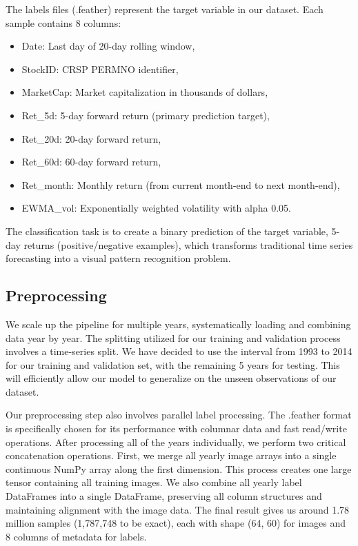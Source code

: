 \documentclass[12pt]{article}
\begin{document}
The labels files (.feather) represent the target variable in our dataset. Each sample contains 8 columns:

\begin{itemize}
	\item Date: Last day of 20-day rolling window,
	\item StockID: CRSP PERMNO identifier,
	\item MarketCap: Market capitalization in thousands of dollars,
	\item Ret\_5d: 5-day forward return (primary prediction target),
	\item Ret\_20d: 20-day forward return,
	\item Ret\_60d: 60-day forward return,
	\item Ret\_month: Monthly return (from current month-end to next month-end),
	\item EWMA\_vol: Exponentially weighted volatility with alpha 0.05.
\end{itemize}
The classification task is to create a binary prediction of the target variable, 5-day returns (positive/negative examples), which transforms traditional time series forecasting into a visual pattern recognition problem.

\subsection*{Preprocessing}

We scale up the pipeline for multiple years, systematically loading and combining data year by year. The splitting utilized for our training and validation process involves a time-series split. We have decided to use the interval from 1993 to 2014 for our training and validation set, with the remaining 5 years for testing. This will efficiently allow our model to generalize on the unseen observations of our dataset.

Our preprocessing step also involves parallel label processing. The .feather format is specifically chosen for its performance with columnar data and fast read/write operations. After processing all of the years individually, we perform two critical concatenation operations. First, we merge all yearly image arrays into a single continuous NumPy array along the first dimension. This process creates one large tensor containing all training images. We also combine all yearly label DataFrames into a single DataFrame, preserving all column structures and maintaining alignment with the image data. The final result gives us around 1.78 million samples (1,787,748 to be exact), each with shape (64, 60) for images and 8 columns of metadata for labels.
\end{document}
